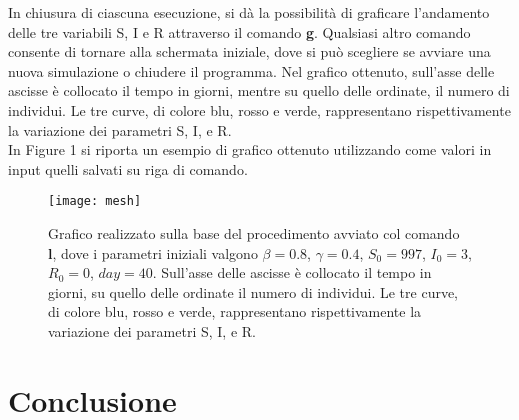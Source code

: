 \documentclass[11pt, a4paper]{article}
\begin{document}
In chiusura di ciascuna esecuzione, si d\`{a} la possibilit\`{a} di graficare l'andamento delle tre variabili S, I e R attraverso il comando \textbf{g}. Qualsiasi altro comando consente di tornare alla schermata iniziale, dove si può scegliere se avviare una nuova simulazione o chiudere il programma. Nel grafico ottenuto, sull'asse delle ascisse è collocato il tempo in giorni, mentre su quello delle ordinate, il numero di individui. Le tre curve, di colore blu, rosso e verde, rappresentano rispettivamente la variazione dei parametri S, I, e R.\\

In Figure 1 si riporta un esempio di grafico ottenuto utilizzando come valori in input quelli salvati su riga di comando. 
\begin{figure}[h]
    \centering
    \texttt{[image: mesh]}
    \caption{Grafico realizzato sulla base del procedimento avviato col comando \textbf{l}, dove i parametri iniziali valgono  $\beta = 0.8$, $\gamma = 0.4$, $S_0 = 997$, $I_0 = 3$, $R_0 = 0$, $day = 40$. Sull'asse delle ascisse è collocato il tempo in giorni, su quello delle ordinate il numero di individui. Le tre curve, di colore blu, rosso e verde, rappresentano rispettivamente la variazione dei parametri S, I, e R.}
    \label{fig:mesh1}
\end{figure}

\section{Conclusione}
\end{document}
